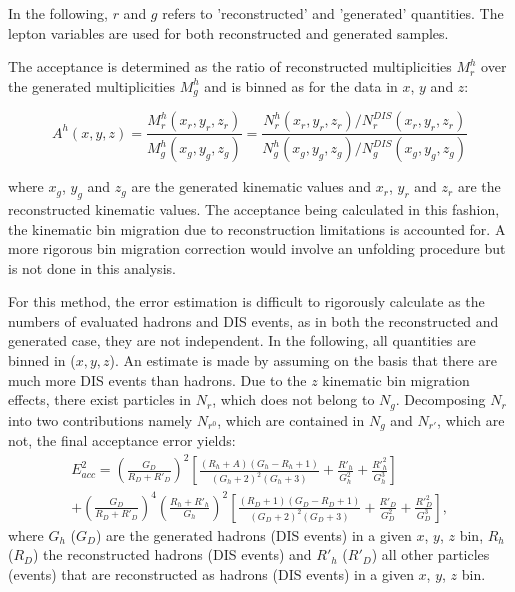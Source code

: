 In the following, $r$ and $g$ refers to 'reconstructed' and 'generated' quantities. The lepton variables are used for both reconstructed and generated samples.

The acceptance is determined as the ratio of reconstructed multiplicities $M^h_r$ over the generated multiplicities $M^h_g$ and is binned as for the data in $x$, $y$ and $z$:

\begin{equation}
  A^h(x,y,z) = \frac{M^h_r(x_r,y_r,z_r)}{M^h_g(x_g,y_g,z_g)}=\frac{N^h_r(x_r,y_r,z_r)/N^{DIS}_r(x_r,y_r,z_r)}{N^h_g(x_g,y_g,z_g)/N^{DIS}_g(x_g,y_g,z_g)}
\end{equation}

where $x_g$, $y_g$ and $z_g$ are the generated kinematic values and $x_r$, $y_r$ and $z_r$ are the reconstructed kinematic values. The acceptance being calculated in this fashion, the kinematic bin migration due to reconstruction limitations is accounted for. A more rigorous bin migration correction would involve an unfolding procedure but is not done in this analysis.

For this method, the error estimation is difficult to rigorously calculate as the numbers of evaluated hadrons and DIS events, as in both the reconstructed and generated case, they are not independent. In the following, all quantities are binned in ($x,y,z$). An estimate is made by assuming on the basis that there are much more DIS events than hadrons. Due to the $z$ kinematic bin migration effects, there exist particles in $N_r$, which does not belong to $N_g$. Decomposing $N_r$ into two contributions namely $N_{r^0}$, which are contained in $N_g$ and $N_{r'}$, which are not, the final acceptance error yields:
%
\begin{equation}
  \begin{split}
    E^2_{acc} = \left (\frac{G_D}{R_D+R'_{D}}\right )^2\left [\frac{(R_h+A)(G_h-R_h+1)}{(G_h+2)^2(G_h+3)}+\frac{R'_{h}}{G^2_h}+\frac{R'^2_h}{G^3_h}\right ] \\
                + \left (\frac{G_D}{R_D+R'_{D}}\right )^4\left (\frac{R_h+R'_h}{G_h}\right )^2\left [\frac{(R_D+1)(G_D-R_D+1)}{(G_D+2)^2(G_D+3)}+\frac{R'_D}{G^2_D}+\frac{R'^2_D}{G^3_D}\right ],
  \end{split}
\end{equation}
%
where $G_h$ ($G_D$) are the generated hadrons (DIS events) in a given $x$, $y$, $z$ bin, $R_h$ ($R_D$) the reconstructed hadrons (DIS events) and $R'_h$ ($R'_D$) all other particles (events) that are reconstructed as hadrons (DIS events) in a given $x$, $y$, $z$ bin.


